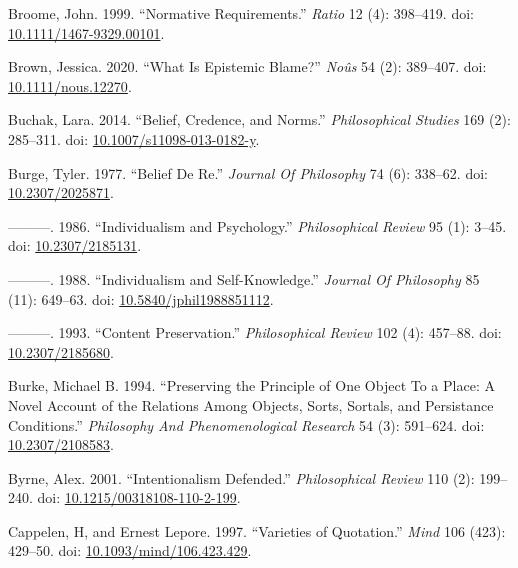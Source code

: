 \documentclass[
  10pt,
  letterpaper,
  DIV=11,
  numbers=noendperiod,
  twoside]{scrartcl}
\newlength{\cslhangindent}
\newenvironment{CSLReferences}[2] %
 {\begin{list}{}{%
  \setlength{\itemindent}{0pt}
  \setlength{\leftmargin}{0pt}
  \setlength{\parsep}{0pt}
  \ifodd #1
   \setlength{\leftmargin}{\cslhangindent}
   \setlength{\itemindent}{-1\cslhangindent}
  \fi
  \setlength{\itemsep}{#2\baselineskip}}}
 {\end{list}}
\begin{document}
\begin{CSLReferences}{1}{0}
Broome, John. 1999. {``Normative Requirements.''} \emph{Ratio} 12 (4):
398--419. doi:
\href{https://doi.org/10.1111/1467-9329.00101}{10.1111/1467-9329.00101}.

Brown, Jessica. 2020. {``What Is Epistemic Blame?''} \emph{Noûs} 54 (2):
389--407. doi:
\href{https://doi.org/10.1111/nous.12270}{10.1111/nous.12270}.

Buchak, Lara. 2014. {``Belief, Credence, and Norms.''}
\emph{Philosophical Studies} 169 (2): 285--311. doi:
\href{https://doi.org/10.1007/s11098-013-0182-y}{10.1007/s11098-013-0182-y}.

Burge, Tyler. 1977. {``Belief De Re.''} \emph{Journal Of Philosophy} 74
(6): 338--62. doi:
\href{https://doi.org/10.2307/2025871}{10.2307/2025871}.

---------. 1986. {``Individualism and Psychology.''} \emph{Philosophical
Review} 95 (1): 3--45. doi:
\href{https://doi.org/10.2307/2185131}{10.2307/2185131}.

---------. 1988. {``Individualism and Self-Knowledge.''} \emph{Journal
Of Philosophy} 85 (11): 649--63. doi:
\href{https://doi.org/10.5840/jphil1988851112}{10.5840/jphil1988851112}.

---------. 1993. {``Content Preservation.''} \emph{Philosophical Review}
102 (4): 457--88. doi:
\href{https://doi.org/10.2307/2185680}{10.2307/2185680}.

Burke, Michael B. 1994. {``Preserving the Principle of One Object To a
Place: A Novel Account of the Relations Among Objects, Sorts, Sortals,
and Persistance Conditions.''} \emph{Philosophy And Phenomenological
Research} 54 (3): 591--624. doi:
\href{https://doi.org/10.2307/2108583}{10.2307/2108583}.

Byrne, Alex. 2001. {``Intentionalism Defended.''} \emph{Philosophical
Review} 110 (2): 199--240. doi:
\href{https://doi.org/10.1215/00318108-110-2-199}{10.1215/00318108-110-2-199}.

Cappelen, H, and Ernest Lepore. 1997. {``Varieties of Quotation.''}
\emph{Mind} 106 (423): 429--50. doi:
\href{https://doi.org/10.1093/mind/106.423.429}{10.1093/mind/106.423.429}.


\end{CSLReferences}
\end{document}
